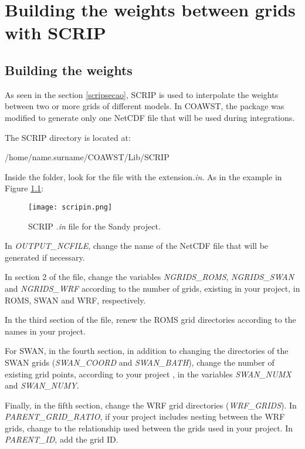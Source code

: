 \chapter{Building the weights between grids with SCRIP}
\bigskip
\section{Building the weights}
\bigskip
\noindent As seen in the section \textcolor{bleu_cite}{\ref{scripsecao}}, SCRIP is used to interpolate the weights between two or more grids of different models. 
In COAWST, the package was modified to generate only one NetCDF file that will be used during integrations.
\bigskip

\noindent The SCRIP directory is located at:
\bigskip

\begin{bashcode}
/home/name.surname/COAWST/Lib/SCRIP
\end{bashcode}
\bigskip

\noindent Inside the folder, look for the file with the extension\textit{.in}. As in the example in Figure \textcolor{bleu_cite}{\ref{scripinnedit}}:

\begin{figure}[H]
    \centering
    \texttt{[image: scripin.png]}
    \caption{SCRIP \textit{.in} file for the Sandy project.}
    \label{scripinnedit}
\end{figure}
\bigskip

\noindent In \textit{OUTPUT\_NCFILE}, change the name of the NetCDF file that will be generated if necessary.
\bigskip

\noindent In section 2 of the file, change the variables \textit{NGRIDS\_ROMS}, \textit{NGRIDS\_SWAN} and \textit{NGRIDS\_WRF} according to the number of grids, 
existing in your project, in ROMS, SWAN and WRF, respectively.
\bigskip

\noindent In the third section of the file, renew the ROMS grid directories according to the names in your project.
\bigskip

\noindent For SWAN, in the fourth section, in addition to changing the directories of the SWAN grids (\textit{SWAN\_COORD} and \textit{SWAN\_BATH}), change the 
number of existing grid points, according to your project , in the variables \textit {SWAN\_NUMX} and \textit{SWAN\_NUMY}.
\bigskip

\noindent Finally, in the fifth section, change the WRF grid directories (\textit{WRF\_GRIDS}). In \textit {PARENT\_GRID\_RATIO}, if your project includes nesting 
between the WRF grids, change to the relationship used between the grids used in your project. In \textit{PARENT\_ID}, add the grid ID.
\bigskip

